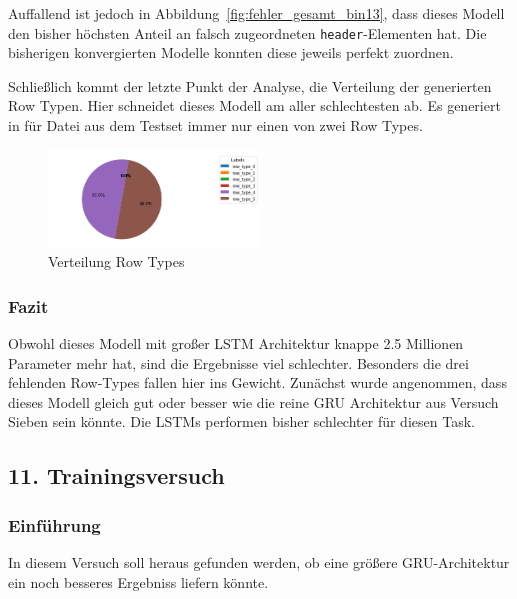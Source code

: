 \documentclass[pdftex,a4paper,halfparskip, article]{scrartcl}
\begin{document}
Auffallend ist jedoch in Abbildung~\ref{fig:fehler_gesamt_bin13}, dass dieses Modell den bisher höchsten Anteil an falsch zugeordneten \texttt{header}-Elementen hat. Die bisherigen konvergierten Modelle konnten diese jeweils perfekt zuordnen. 

Schließlich kommt der letzte Punkt der Analyse, die Verteilung der generierten Row Typen. Hier schneidet dieses Modell am aller schlechtesten ab. Es generiert in für Datei aus dem Testset immer nur einen von zwei Row Types. 

\begin{figure}[h]
\label{fig:bin13_row_type}

\centering
\includegraphics[width=0.5\textwidth]{predictions_bin13_predicted_row_type_distribution}
\caption{Verteilung Row Types}
\end{figure}


\subsubsection*{Fazit}

Obwohl dieses Modell mit großer LSTM Architektur knappe 2.5 Millionen Parameter mehr hat, sind die Ergebnisse viel schlechter. Besonders die drei fehlenden Row-Types fallen hier ins Gewicht. Zunächst wurde angenommen, dass dieses Modell gleich gut oder besser wie die reine GRU Architektur aus Versuch Sieben sein könnte. Die LSTMs performen bisher schlechter für diesen Task. 




\subsection{11. Trainingsversuch}\label{sec:elf}


\subsubsection*{Einführung}
In diesem Versuch soll heraus gefunden werden, ob eine größere GRU-Architektur ein noch besseres Ergebniss liefern könnte.
\end{document}
